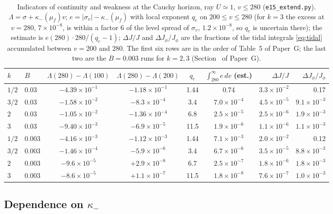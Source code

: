 \documentclass[11pt]{article}
\newcommand{\Gtabproj}{5}\newcommand{\Gtabehrate}{2}\newcommand{\Gtabeh}{1}\newcommand{\Gtabray}{4}
\begin{document}
\begin{table}[t]
\centering\footnotesize\setlength{\tabcolsep}{3pt}
\begin{tabular}{llccccrr}
\hline
$k$ & $B$ & $\Lambda(280)-\Lambda(100)$ & $\Lambda(280)-\Lambda(200)$ & $q_e$ & $\int_{280}^{\infty}e\,dv$ (est.) & $\Delta J/J$ & $\Delta J_\phi/J_\phi$ \\
\hline
$1/2$ & 0.03 & $-4.39\times10^{-1}$ & $-1.18\times10^{-1}$ & 1.44 & 0.74 & $3.3\times10^{-2}$ & 0.17 \\
$3/2$ & 0.03 & $-1.58\times10^{-2}$ & $-8.3\times10^{-4}$ & 3.4 & $7.0\times10^{-4}$ & $4.5\times10^{-5}$ & $9.1\times10^{-3}$ \\
$2$ & 0.03 & $-1.05\times10^{-2}$ & $-1.36\times10^{-4}$ & 6.8 & $2.5\times10^{-5}$ & $2.5\times10^{-6}$ & $1.9\times10^{-3}$ \\
$3$ & 0.03 & $-9.40\times10^{-3}$ & $-6.9\times10^{-5}$ & 11.5 & $1.9\times10^{-6}$ & $1.1\times10^{-6}$ & $1.1\times10^{-3}$ \\
$1/2$ & 0.003 & $-4.16\times10^{-3}$ & $-1.12\times10^{-3}$ & 1.44 & $7.1\times10^{-3}$ & $2.0\times10^{-2}$ & 0.12 \\
$3/2$ & 0.003 & $-1.46\times10^{-4}$ & $-5.9\times10^{-6}$ & 3.4 & $6.7\times10^{-6}$ & $3.5\times10^{-5}$ & $8.8\times10^{-3}$ \\
$2$ & 0.003 & $-9.6\times10^{-5}$ & $+2.9\times10^{-8}$ & 6.7 & $2.5\times10^{-7}$ & $1.8\times10^{-6}$ & $1.8\times10^{-3}$ \\
$3$ & 0.003 & $-8.6\times10^{-5}$ & $+1.1\times10^{-7}$ & 11.5 & $1.8\times10^{-8}$ & $7.6\times10^{-7}$ & $1.0\times10^{-3}$ \\
\hline
\end{tabular}
\caption{Indicators of continuity and weakness at the Cauchy horizon, ray $U\simeq1$, $v\le280$ (\texttt{e15\_extend.py}). $\Lambda=\sigma+\kappa_-(\mu_f)v$; $e=|\sigma_v|-\kappa_-(\mu_f)$ with local exponent $q_e$ on $200\le v\le280$ (for $k=3$ the excess at $v=280$, $7\times10^{-8}$, is within a factor 6 of the level spread of $\sigma_v$, $1.2\times10^{-8}$, so $q_e$ is uncertain there); the estimate is $e(280)\cdot280/(q_e-1)$; $\Delta J/J$ and $\Delta J_\phi/J_\phi$ are the fractions of the tidal integrals \eqref{eq:tidal} accumulated between $v=200$ and $280$. The first six rows are in the order of Table~\Gtabproj{} of Paper~G; the last two are the $B=0.003$ runs for $k=2,3$ (Section~\Grayn{} of Paper~G).}
\label{tab:ext}
\end{table}

\subsection{Dependence on \texorpdfstring{$\kappa_-$}{kappa-}}
\label{sec:kscan}
\label{sec:kappa}
\end{document}

